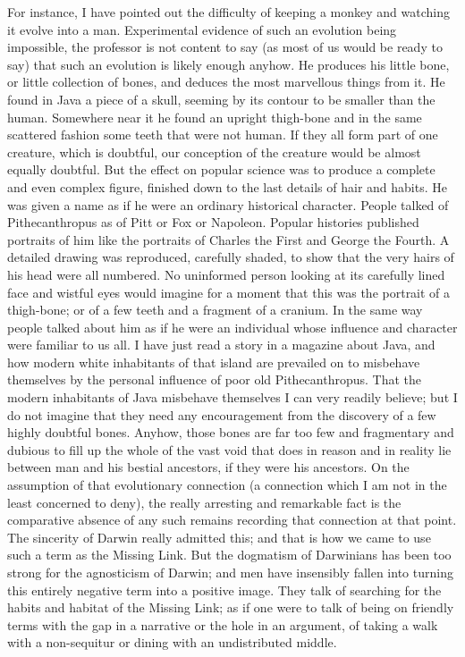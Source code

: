 For instance, I have pointed out the difficulty of keeping a monkey and watching it evolve into a man. Experimental evidence of such an evolution being impossible, the professor is not content to say (as most of us would be ready to say) that such an evolution is likely enough anyhow. He produces his little bone, or little collection of bones, and deduces the most marvellous things from it. He found in Java a piece of a skull, seeming by its contour to be smaller than the human. Somewhere near it he found an upright thigh-bone and in the same scattered fashion some teeth that were not human. If they all form part of one creature, which is doubtful, our conception of the creature would be almost equally doubtful. But the effect on popular science was to produce a complete and even complex figure, finished down to the last details of hair and habits. He was given a name as if he were an ordinary historical character. People talked of Pithecanthropus as of Pitt or Fox or Napoleon. Popular histories published portraits of him like the portraits of Charles the First and George the Fourth. A detailed drawing was reproduced, carefully shaded, to show that the very hairs of his head were all numbered. No uninformed person looking at its carefully lined face and wistful eyes would imagine for a moment that this was the portrait of a thigh-bone; or of a few teeth and a fragment of a cranium. In the same way people talked about him as if he were an individual whose influence and character were familiar to us all. I have just read a story in a magazine about Java, and how modern white inhabitants of that island are prevailed on to misbehave themselves by the personal influence of poor old Pithecanthropus. That the modern inhabitants of Java misbehave themselves I can very readily believe; but I do not imagine that they need any encouragement from the discovery of a few highly doubtful bones. Anyhow, those bones are far too few and fragmentary and dubious to fill up the whole of the vast void that does in reason and in reality lie between man and his bestial ancestors, if they were his ancestors. On the assumption of that evolutionary connection (a connection which I am not in the least concerned to deny), the really arresting and remarkable fact is the comparative absence of any such remains recording that connection at that point. The sincerity of Darwin really admitted this; and that is how we came to use such a term as the Missing Link. But the dogmatism of Darwinians has been too strong for the agnosticism of Darwin; and men have insensibly fallen into turning this entirely negative term into a positive image. They talk of searching for the habits and habitat of the Missing Link; as if one were to talk of being on friendly terms with the gap in a narrative or the hole in an argument, of taking a walk with a non-sequitur or dining with an undistributed middle.

